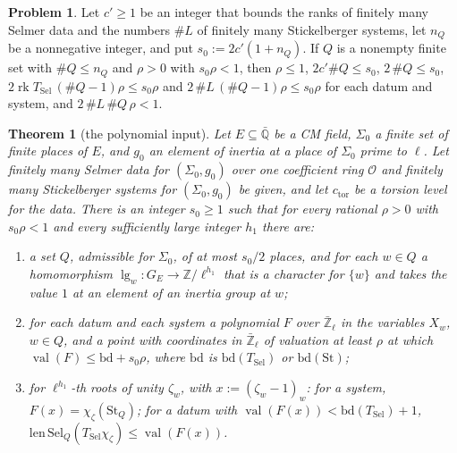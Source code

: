 \documentclass[reqno]{amsart}
\theoremstyle{definition}
\newtheorem{problem}{Problem}[section]
\theoremstyle{plain}
\newtheorem{theorem}{Theorem}[section]
\newcommand{\Z}{\mathbb{Z}}
\newcommand{\Q}{\mathbb{Q}}
\newcommand{\Zl}{\bar{\mathbb{Z}}_\ell}
\newcommand{\Sel}{\mathrm{Sel}}
\newcommand{\val}{\operatorname{val}}
\newcommand{\rk}{\operatorname{rk}}
\newcommand{\Oc}{\mathcal{O}}
\newcommand{\St}{\mathrm{St}}
\newcommand{\bd}{\mathrm{bd}}
\newcommand{\TS}{T_{\mathrm{Sel}}}
\newcommand{\ctor}{c_{\mathrm{tor}}}
\begin{document}
\begin{problem}\label{pr:order}
Let \(c' \ge 1\) be an integer that bounds the ranks of finitely many Selmer data and the numbers \(\#L\) of finitely many Stickelberger systems, let \(n_Q\) be a nonnegative integer, and put \(s_0 := 2c'(1 + n_Q)\).  If \(Q\) is a nonempty finite set with \(\#Q \le n_Q\) and \(\rho > 0\) with \(s_0\rho < 1\), then \(\rho \le 1\), \(2c'\#Q \le s_0\), \(2\,\#Q \le s_0\), \(2\rk \TS\,(\#Q - 1)\rho \le s_0\rho\) and \(2\,\#L\,(\#Q - 1)\rho \le s_0\rho\) for each datum and system, and \(2\,\#L\,\#Q\,\rho < 1\).
\end{problem}

\begin{theorem}[the polynomial input]\label{thm:polynomials}
Let \(E \subseteq \bar{\Q}\) be a CM field, \(\Sigma_0\) a finite set of finite places of \(E\), and \(g_0\) an element of inertia at a place of \(\Sigma_0\) prime to \(\ell\).  Let finitely many Selmer data for \((\Sigma_0, g_0)\) over one coefficient ring \(\Oc\) and finitely many Stickelberger systems for \((\Sigma_0, g_0)\) be given, and let \(\ctor\) be a torsion level for the data.  There is an integer \(s_0 \ge 1\) such that for every rational \(\rho > 0\) with \(s_0\rho < 1\) and every sufficiently large integer \(h_1\) there are:
\begin{enumerate}
\item a set \(Q\), admissible for \(\Sigma_0\), of at most \(s_0/2\) places, and for each \(w \in Q\) a homomorphism \(\lg_w\colon G_E \to \Z/\ell^{h_1}\) that is a character for \(\{w\}\) and takes the value \(1\) at an element of an inertia group at \(w\);
\item for each datum and each system a polynomial \(F\) over \(\Zl\) in the variables \(X_w\), \(w \in Q\), and a point with coordinates in \(\Zl\) of valuation at least \(\rho\) at which \(\val(F) \le \bd + s_0\rho\), where \(\bd\) is \(\bd(\TS)\) or \(\bd(\St)\);
\item for \(\ell^{h_1}\)-th roots of unity \(\zeta_w\), with \(x := (\zeta_w - 1)_w\): for a system, \(F(x) = \chi_\zeta(\St_Q)\); for a datum with \(\val(F(x)) < \bd(\TS) + 1\), \(\mathrm{len}\,\Sel_Q(\TS\chi_\zeta) \le \val(F(x))\).
\end{enumerate}
\end{theorem}
\end{document}
